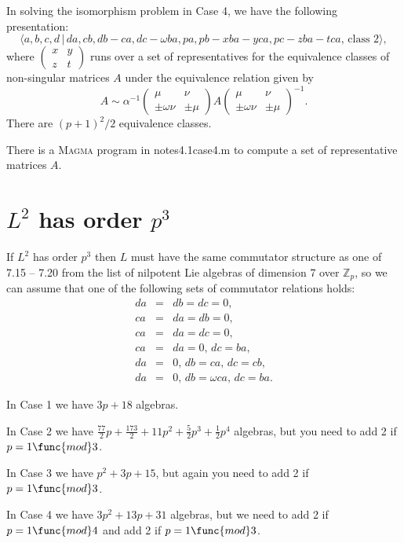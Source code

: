 \documentclass[10pt]{article}
\begin{document}
In solving the isomorphism problem in Case 4, we have the following
presentation:%
\[
\langle a,b,c,d\,|\,da,cb,db-ca,dc-\omega ba,pa,pb-xba-yca,pc-zba-tca,\,%
\text{class }2\rangle , 
\]%
where $\left( 
\begin{array}{ll}
x & y \\ 
z & t%
\end{array}%
\right) $ runs over a set of representatives for the equivalence classes of
non-singular matrices $A$ under the equivalence relation given by%
\[
A\sim \alpha ^{-1}\left( 
\begin{array}{ll}
\mu & \nu \\ 
\pm \omega \nu & \pm \mu%
\end{array}%
\right) A\left( 
\begin{array}{ll}
\mu & \nu \\ 
\pm \omega \nu & \pm \mu%
\end{array}%
\right) ^{-1}. 
\]%
There are $(p+1)^{2}/2$ equivalence classes.

There is a \textsc{Magma} program in notes4.1case4.m to compute a set of
representative matrices $A$.

\section{$L^{2}$ has order $p^{3}$}

If $L^2$ has order $p^3$ then $L$ must have the same commutator structure as
one of 7.15 -- 7.20 from the list of nilpotent Lie algebras of dimension 7
over $\mathbb{Z}_p$, so we can assume that one of the following sets of
commutator relations holds: 
\begin{eqnarray*}
da &=&db=dc=0, \\
ca &=&da=db=0, \\
ca &=&da=dc=0, \\
ca &=&da=0,\,dc=ba, \\
da &=&0,\,db=ca,\,dc=cb, \\
da &=&0,\,db=\omega ca,\,dc=ba.
\end{eqnarray*}

In Case 1 we have $3p+18$ algebras.

In Case 2 we have $\allowbreak \frac{77}{2}p+\frac{173}{2}+11p^{2}+\frac{5}{2%
}p^{3}+\frac{1}{2}p^{4}$ algebras, but you need to add 2 if $p=1\func{mod}3$.

In Case 3 we have $\allowbreak p^{2}+3p+15$, but again you need to add 2 if $%
p=1\func{mod}3$.

In Case 4 we have $3p^{2}+13p+31$ algebras, but we need to add 2 if $p=1%
\func{mod}4$ and add 2 if $p=1\func{mod}3$.
\end{document}
